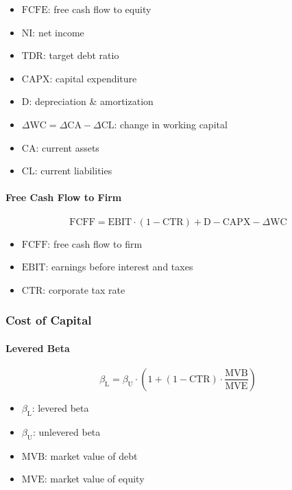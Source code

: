 \begin{itemize}
  \item[] $\text{FCFE}$: free cash flow to equity
  \item[] $\text{NI}$: net income
  \item[] $\text{TDR}$: target debt ratio
  \item[] $\text{CAPX}$: capital expenditure
  \item[] $\text{D}$: depreciation \& amortization
  \item[] $\Delta \text{WC} = \Delta \text{CA} - \Delta \text{CL}$: change in working capital
  \item[] $\text{CA}$: current assets
  \item[] $\text{CL}$: current liabilities
\end{itemize}

\paragraph{Free Cash Flow to Firm}

$$
\text{FCFF} = \text{EBIT} \cdot (1 - \text{CTR}) + \text{D} - \text{CAPX} - \Delta \text{WC}
$$

\begin{itemize}
  \item[] $\text{FCFF}$: free cash flow to firm
  \item[] $\text{EBIT}$: earnings before interest and taxes
  \item[] $\text{CTR}$: corporate tax rate
\end{itemize}

\subsubsection{Cost of Capital}

\paragraph{Levered Beta}

$$
\beta_{\text{L}} = \beta_{\text{U}} \cdot \left(1 + (1 - \text{CTR}) \cdot \frac{\text{MVB}}{\text{MVE}}\right)
$$

\begin{itemize}
  \item[] $\beta_{\text{L}}$: levered beta
  \item[] $\beta_{\text{U}}$: unlevered beta
  \item[] $\text{MVB}$: market value of debt
  \item[] $\text{MVE}$: market value of equity
\end{itemize}

